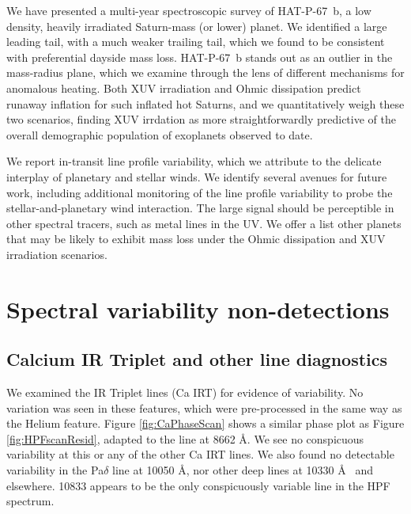 \documentclass[twocolumn]{aastex631}
\begin{document}
We have presented a multi-year spectroscopic survey of HAT-P-67~b, a low density, heavily irradiated Saturn-mass (or lower) planet.  We identified a large leading tail, with a much weaker trailing tail, which we found to be consistent with preferential dayside mass loss.  HAT-P-67~b stands out as an outlier in the mass-radius plane, which we examine through the lens of different mechanisms for anomalous heating.  Both XUV irradiation and Ohmic dissipation predict runaway inflation for such inflated hot Saturns, and we quantitatively weigh these two scenarios, finding XUV irrdation as more straightforwardly predictive of the overall demographic population of exoplanets observed to date.  

We report in-transit line profile variability, which we attribute to the delicate interplay of planetary and stellar winds.  We identify several avenues for future work, including additional monitoring of the line profile variability to probe the stellar-and-planetary wind interaction.  The large signal should be perceptible in other spectral tracers, such as metal lines in the UV.  We offer a list other planets that may be likely to exhibit mass loss under the Ohmic dissipation and XUV irradiation scenarios.
 
\clearpage
\pagebreak


\appendix

\section{Spectral variability non-detections} \label{appendixSec}
\subsection{Calcium IR Triplet and other line diagnostics}
We examined the  IR Triplet lines (Ca IRT) for evidence of variability.  No variation was seen in these features, which were pre-processed in the same way as the Helium feature.  Figure \ref{fig:CaPhaseScan} shows a similar phase plot as Figure \ref{fig:HPFscanResid}, adapted to the line at 8662 \AA.  We see no conspicuous variability at this or any of the other Ca IRT lines.  We also found no detectable variability in the Pa$\delta$ line at 10050 \AA, nor other deep lines at 10330 \AA~ and elsewhere.   10833 appears to be the only conspicuously variable line in the HPF spectrum.
\end{document}
